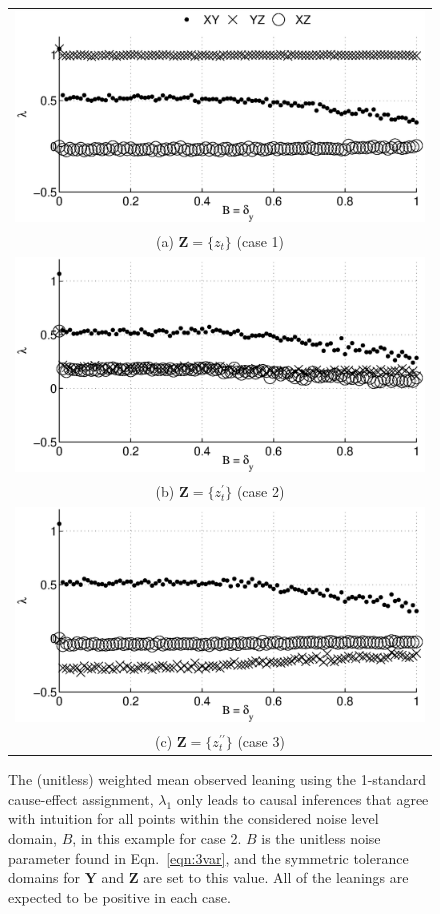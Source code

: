 \documentclass[twocolumn,aps,pre,groupedaddress]{revtex4-1}
\begin{document}
\begin{figure}[ht]
\begin{tabular}{c}
\includegraphics[scale=0.40]{XYZIRexample_Bxytol.eps} \\ 
(a) $\mathbf{Z} = \{z_t\}$ (case 1) \\
\includegraphics[scale=0.40]{XYZIRexample_BxytolZXandY.eps} \\
(b) $\mathbf{Z} = \{z^\prime_t\}$ (case 2) \\
\includegraphics[scale=0.40]{XYZIRexample_BxytolZXandYandZ.eps} \\
(c) $\mathbf{Z} = \{z^{\prime\prime}_t\}$ (case 3)\\
\end{tabular}
\caption{The (unitless) weighted mean observed leaning using the 1-standard cause-effect assignment, $\lambda_1$ only leads to causal inferences that agree with intuition for all points within the considered noise level domain, $B$, in this example for case 2.  $B$ is the unitless noise parameter found in Eqn.\ \ref{eqn:3var}, and the symmetric tolerance domains for $\mathbf{Y}$ and $\mathbf{Z}$ are set to this value.  All of the leanings are expected to be positive in each case.}
\label{fig:3var}
\end{figure}
\end{document}
